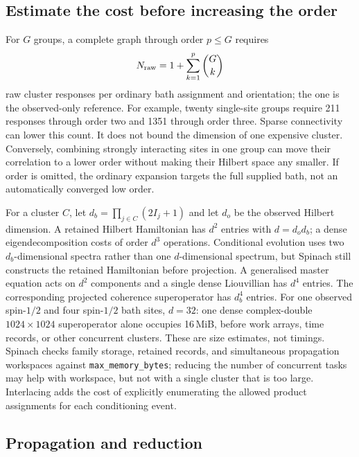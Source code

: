 \documentclass[11pt,a4paper]{article}
\newcommand{\code}[1]{\texttt{#1}}
\begin{document}
\subsection{Estimate the cost before increasing the order}

For $G$ groups, a complete graph through order $p\le G$ requires
\begin{equation}
 N_{\rm raw}=1+\sum_{k=1}^{p}\binom{G}{k}
 \label{eq:cce-numerics-count}
\end{equation}
raw cluster responses per ordinary bath assignment and orientation; the
one is the observed-only reference. For example, twenty single-site
groups require 211 responses through order two and 1351 through order
three. Sparse connectivity can lower this count. It does not bound the
dimension of one expensive cluster. Conversely, combining strongly
interacting sites in one group can move their correlation to a lower
order without making their Hilbert space any smaller. If order is
omitted, the ordinary expansion targets the full supplied bath, not an
automatically converged low order.

For a cluster $C$, let $d_b=\prod_{j\in C}(2I_j+1)$ and let $d_o$ be
the observed Hilbert dimension. A retained Hilbert Hamiltonian has
$d^2$ entries with $d=d_o d_b$; a dense eigendecomposition costs of
order $d^3$ operations. Conditional evolution uses two $d_b$-dimensional
spectra rather than one $d$-dimensional spectrum, but Spinach still
constructs the retained Hamiltonian before projection. A generalised
master equation acts on $d^2$ components and a single dense Liouvillian
has $d^4$ entries. The corresponding projected coherence superoperator
has $d_b^4$ entries. For one observed spin-$1/2$ and four spin-$1/2$
bath sites, $d=32$: one dense complex-double $1024\times1024$
superoperator alone occupies 16\,MiB, before work arrays, time records,
or other concurrent clusters. These are size estimates, not timings.
Spinach checks family storage, retained records, and simultaneous
propagation workspaces against \code{max\_memory\_bytes}; reducing the
number of concurrent tasks may help with workspace, but not with a
single cluster that is too large. Interlacing adds the cost of explicitly
enumerating the allowed product assignments for each conditioning event.

\subsection{Propagation and reduction}
\end{document}
